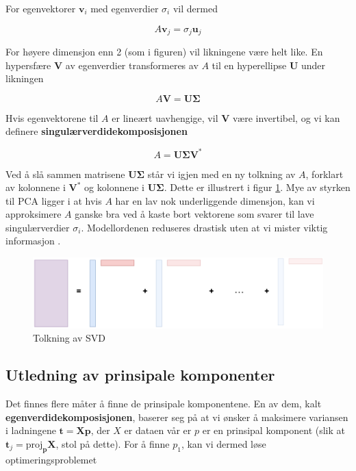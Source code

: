 For egenvektorer $\mathbf{v}_i$ med egenverdier $\sigma_i$ vil dermed

\begin{equation}
	A \mathbf{v}_j = \sigma_j \mathbf{u}_j
\end{equation}

For høyere dimensjon enn 2 (som i figuren) vil likningene være helt like. En hypersfære $\mathbf{V}$ av egenverdier transformeres av $A$ til en hyperellipse $\mathbf{U}$ under likningen

\begin{equation}
	A \mathbf{V} =\mathbf{U} \mathbf{\Sigma}
\end{equation}

Hvis egenvektorene til $A$ er lineært uavhengige, vil $\mathbf{V}$ være invertibel, og vi kan definere \textbf{singulærverdidekomposisjonen}

\begin{equation}
	A  =\mathbf{U} \mathbf{\Sigma} \mathbf{V}^*
\end{equation}

Ved å slå sammen matrisene $\mathbf{U} \mathbf{\Sigma}$ står vi igjen med en ny tolkning av $A$, forklart av kolonnene i $\mathbf{V}^*$ og kolonnene i $\mathbf{U} \mathbf{\Sigma}$. Dette er illustrert i figur \ref{fig:pca_komponentvis}. Mye av styrken til PCA ligger i at hvis $A$ har en lav nok underliggende dimensjon, kan vi approksimere $A$ ganske bra ved å kaste bort vektorene som svarer til lave singulærverdier $\sigma_i$. Modellordenen reduseres drastisk uten at vi mister viktig informasjon \Cooley.

\begin{figure}[h]
	\centering
	\includegraphics[width=\textwidth]{figurer/pca_komponentvis}
	\caption{Tolkning av SVD}
	\label{fig:pca_komponentvis}
\end{figure}

\subsection{Utledning av prinsipale komponenter}
Det finnes flere måter å finne de prinsipale komponentene. En av dem, kalt \textbf{egenverdidekomposisjonen}, baserer seg på at vi ønsker å maksimere variansen i ladningene $\mathbf{t} = \mathbf{Xp}$, der $X$ er dataen vår er $p$ er en prinsipal komponent (slik at $\mathbf{t}_j = \textrm{proj}_{\mathbf{p}} \mathbf{X}$, stol på dette). For å finne $p_1$, kan vi dermed løse optimeringsproblemet

